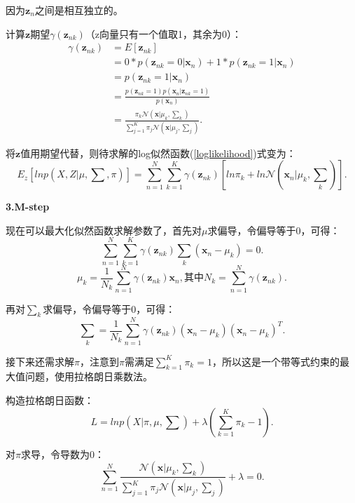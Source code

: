 \documentclass[UTF8]{ctexart}
\begin{document}
因为${\mathbf z_n}$之间是相互独立的。
 
计算$\mathbf z$期望$\gamma(\mathbf z_{nk})$（z向量只有一个值取1，其余为0）：
\begin{equation}
  \begin{split}
    \gamma(\mathbf z_{nk}) &= E[\mathbf z_{nk}]\\
    &= 0*p(\mathbf z_{nk}=0|\mathbf x_n)+1*p(\mathbf z_{nk}=1|\mathbf x_n)\\
    &=p(\mathbf z_{nk}=1|\mathbf x_n)\\
    &=\frac{p(\mathbf z_{nk}=1)p(\mathbf x_n|\mathbf z_{nk}=1)}{p(\mathbf x_n)}\\
    &=\frac{\pi_k\mathcal N(\mathbf x|\mu_k,\sum_k)}{\sum_{j=1}^K\pi_j\mathcal N(\mathbf x|\mu_j,\sum_j)}.
  \end{split}
\end{equation}

将$\mathbf z$值用期望代替，则待求解的log似然函数(\ref{loglikelihood})式变为：
\begin{equation}
  E_z[lnp(X,Z|\mu,\sum,\pi)] = \sum_{n=1}^N\sum_{k=1}^K\gamma (\mathbf z_{nk})[ln\pi_k + ln\mathcal N(\mathbf x_n|\mu_k,\sum_k)].
\end{equation}

\textbf{3.M-step}

现在可以最大化似然函数求解参数了，首先对$\mu$求偏导，令偏导等于0，可得：
\begin{equation}
  \sum_{n=1}^N\sum_{k=1}^K\gamma (\mathbf z_{nk})\sum_k(\mathbf x_n-\mu_k) = 0.
\end{equation}
\begin{equation}
  \mu_k = \frac{1}{N_k}\sum_{n=1}^N\gamma (\mathbf z_{nk}){\mathbf x_n},\text{其中}N_k = \sum_{n=1}^N\gamma (\mathbf z_{nk}).
\end{equation}

再对$\sum_k$求偏导，令偏导等于0，可得：
\begin{equation}
  \sum_k = \frac{1}{N_k}\sum_{n=1}^N\gamma (\mathbf z_{nk})(\mathbf x_n-\mu_k)(\mathbf x_n-\mu_k)^T.
\end{equation}

接下来还需求解$\pi$，注意到$\pi$需满足$\sum_{k=1}^K\pi_k=1$，所以这是一个带等式约束的最大值问题，使用拉格朗日乘数法。

构造拉格朗日函数：
\begin{equation}
  L=lnp(X|\pi,\mu,\sum)+\lambda(\sum_{k=1}^K\pi_k-1).
\end{equation}

对$\pi$求导，令导数为0：
\begin{equation}
  \sum_{n=1}^N\frac{\mathcal N(\mathbf x|\mu_k,\sum_k)}{\sum_{j=1}^K\pi_j\mathcal N(\mathbf x|\mu_j,\sum_j)}+\lambda=0.
\end{equation}
\end{document}
